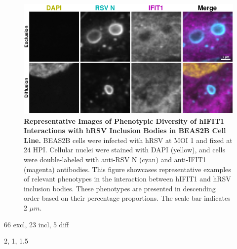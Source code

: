 \begin{figure}
    \centering
    \includegraphics[width=1\linewidth]{08. Chapter 3/Figs/02. Infection/01. IFIT1/06. beas2b i1.pdf}
    \caption[Representative Images of Phenotypic Diversity of hIFIT1 Interactions with hRSV Inclusion Bodies in BEAS2B Cell Line.]{\textbf{Representative Images of Phenotypic Diversity of hIFIT1 Interactions with hRSV Inclusion Bodies in BEAS2B Cell Line.} BEAS2B cells were infected with hRSV at MOI 1 and fixed at 24 HPI. Cellular nuclei were stained with DAPI (yellow), and cells were double-labeled with anti-RSV N (cyan) and anti-IFIT1 (magenta) antibodies. This figure showcases representative examples of relevant phenotypes in the interaction between hIFIT1 and hRSV inclusion bodies. These phenotypes are presented in descending order based on their percentage proportions. The scale bar indicates 2 \(\mu m\).}
    \label{fig:Representative Images of Phenotypic Diversity of hIFIT1 Interactions with hRSV Inclusion Bodies in BEAS2B Cell Line}
\end{figure}

66 excl, 23 incl, 5 diff

2, 1, 1.5


